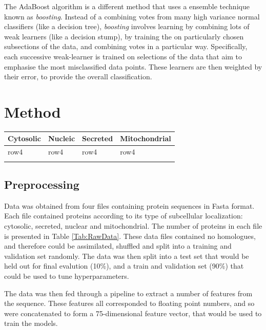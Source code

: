\documentclass{bioinfo}
\begin{document}
The AdaBoost algorithm is a different method that uses a ensemble technique known as \textit{boosting}.
Instead of a combining votes from many high variance normal classifiers (like a decision tree), \textit{boosting} involves learning by combining lots of weak learners (like a decision stump), by training the on particularly chosen subsections of the data, and combining votes in a particular way. 
Specifically, each successive weak-learner is trained on selections of the data that aim to emphasise the most misclassified data points. 
These learners are then weighted by their error, to provide the overall classification.





\section{Method}

\begin{table}[!t]
 {\begin{tabular}{@{}llll@{}}\toprule Cytosolic &
Nucleic & Secreted & Mitochondrial\\\midrule
row4 & row4 & row4 & row4\\\botrule
\end{tabular}}{}
\end{table}

\subsection{Preprocessing}

Data was obtained from four files containing protein sequences in Fasta format. 
Each file contained proteins according to its type of subcellular localization: cytosolic, secreted, nuclear and mitochondrial. 
The number of proteins in each file is presented in Table \ref{Tab:RawData}. 
These data files contained no homologues, and therefore could be assimilated, shuffled and split into a training and validation set randomly. 
The data was then split into a test set that would be held out for final evalution (10\%), and a train and validation set (90\%) that could be used to tune hyperparameters. 

The data was then fed through a pipeline to extract a number of features from the sequence.
These features all corresponded to floating point numbers, and so were concatenated to form a 75-dimensional feature vector, that would be used to train the models. 
\end{document}
